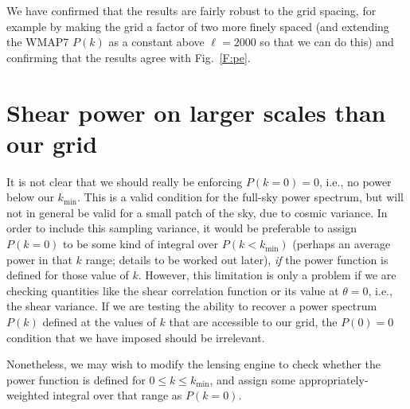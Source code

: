 \documentclass[preprint]{aastex}
\newcommand{\kmin}{\ensuremath{k_\mathrm{min}}}
\begin{document}
We have confirmed that the results are fairly robust to the grid
spacing, for example by making the grid a factor of two more finely
spaced (and extending the WMAP7 $P(k)$ as a constant above $\ell=2000$
so that we can do this) and confirming that the results agree with
Fig.~\ref{F:pe}.

\section{Shear power on larger scales than our grid}\label{S:pk0}

It is not clear that we should really be enforcing $P(k=0)=0$, i.e., no
power below our \kmin.  This is a valid condition for the full-sky
power spectrum, but will not in general be valid for a small patch of
the sky, due to cosmic variance.  In order to include this sampling
variance, it would be preferable to assign $P(k=0)$ to be some kind of
integral over $P(k<\kmin)$ (perhaps an average power in that $k$
range; details to be worked out later), {\em if} the power function is
defined for those value of $k$.  However, this limitation is only a
problem if we are checking quantities like the shear correlation
function or its value at $\theta=0$, i.e., the shear variance.  If we
are testing the ability to recover a power spectrum $P(k)$ defined at
the values of $k$ that are accessible to our grid, the $P(0)=0$
condition that we have imposed should be irrelevant.

Nonetheless, we may wish to modify the lensing engine to check whether
the power function is defined for $0\le k\le\kmin$, and assign some
appropriately-weighted integral over that range as $P(k=0)$.
\end{document}
